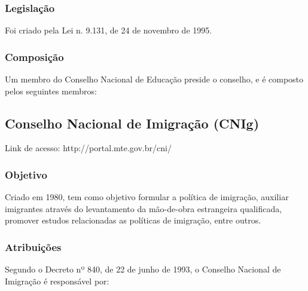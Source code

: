 \subsubsection*{Legislação}

Foi criado pela Lei n. 9.131, de 24 de novembro de 1995.

\subsubsection*{Composição}


Um membro do Conselho Nacional de Educação preside o conselho, e
é composto pelos seguintes membros:

\newpage
\subsection*{Conselho Nacional de Imigração (CNIg)}

Link de acesso: http://portal.mte.gov.br/cni/


\subsubsection*{Objetivo}

Criado em 1980, tem como objetivo formular a política de
imigração, auxiliar imigrantes através do levantamento da
mão-de-obra estrangeira qualificada, promover estudos relacionadas as
políticas de imigração, entre outros.


\subsubsection*{Atribuições}


Segundo o Decreto nº 840, de 22 de junho de 1993, o Conselho
Nacional de Imigração é responsável por:

